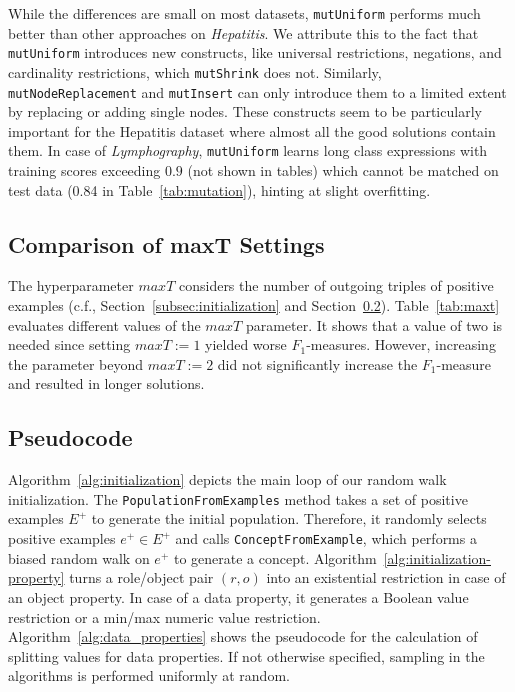 While the differences are small on most datasets, \texttt{mut\-Uniform} performs much better than other approaches on \textit{Hepatitis}. We attribute this to the fact that \texttt{mut\-Uniform} introduces new constructs, like universal restrictions, negations, and cardinality restrictions, which \texttt{mut\-Shrink} does not.
Similarly, \texttt{mut\-Node\-Re\-place\-ment} and \texttt{mut\-Insert} can only introduce them to a limited extent by replacing or adding single nodes. 
These constructs seem to be particularly important for the Hepatitis dataset where almost all the good solutions contain them. 
In case of \textit{Lymphography}, \texttt{mut\-Uniform} learns long class expressions with training scores exceeding $0.9$ (not shown in tables) which cannot be matched on test data (0.84 in Table~\ref{tab:mutation}), hinting at slight overfitting.





\subsection{Comparison of maxT Settings}

The hyperparameter $maxT$ considers the number of outgoing triples of positive examples (c.f., Section~\ref{subsec:initialization} and Section~\ref{subsec:pseudocode}). Table~\ref{tab:maxt} evaluates different values of the $maxT$ parameter. It shows that a value of two is needed since setting $maxT:=1$ yielded worse $F_1$-measures. However, increasing the parameter beyond $maxT:=2$ did not significantly increase the $F_1$-measure and resulted in longer solutions. 

\subsection{Pseudocode}
\label{subsec:pseudocode}

Algorithm~\ref{alg:initialization} depicts the main loop of our random walk initialization. 
The \texttt{PopulationFromExamples} method takes a set of positive examples $E^+$ to generate the initial population. Therefore, it randomly selects positive examples $e^+ \in E^+$ and calls \texttt{ConceptFromExample}, which performs a biased random walk on $e^+$ to generate a concept. 
Algorithm~\ref{alg:initialization-property} turns a role/object pair $(r, o)$ into an existential restriction in case of an object property. In case of a data property, it generates a Boolean value restriction or a min/max numeric value restriction. 
Algorithm~\ref{alg:data_properties} shows the pseudocode for the calculation of splitting values for data properties. If not otherwise specified, sampling in the algorithms is performed uniformly at random.

\clearpage


\newpage
